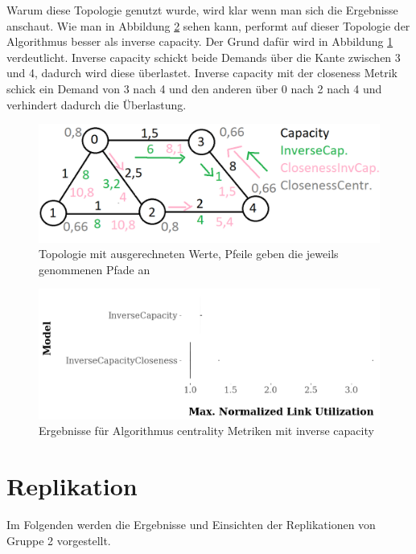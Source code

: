 \documentclass[sigconf, nonacm, review]{acmart}
\begin{document}
Warum diese Topologie genutzt wurde, wird klar wenn man sich die Ergebnisse anschaut.
Wie man in Abbildung \ref{fig:kai_p2_results} sehen kann, performt auf dieser Topologie der Algorithmus besser als inverse capacity.
Der Grund dafür wird in Abbildung \ref{fig:kai_p2_AdTopo} verdeutlicht.
Inverse capacity schickt beide Demands über die Kante zwischen 3 und 4, dadurch wird diese überlastet.
Inverse capacity mit der closeness Metrik schick ein Demand von 3 nach 4 und den anderen über 0 nach 2 nach 4 und verhindert dadurch die Überlastung.

\begin{figure}
    \centering
    \includegraphics[width=\linewidth]{figures/kai_p2_TopoAd.png}
    \caption{Topologie mit ausgerechneten Werte, Pfeile geben die jeweils genommenen Pfade an}
    \label{fig:kai_p2_AdTopo}
\end{figure}

\begin{figure}
    \centering
    \includegraphics[width=\linewidth]{figures/kai_p2_results.png}
    \caption{Ergebnisse für Algorithmus centrality Metriken mit inverse capacity}
    \label{fig:kai_p2_results}
\end{figure}


\section{Replikation}
Im Folgenden werden die Ergebnisse und Einsichten der Replikationen von Gruppe 2 vorgestellt.
\end{document}
